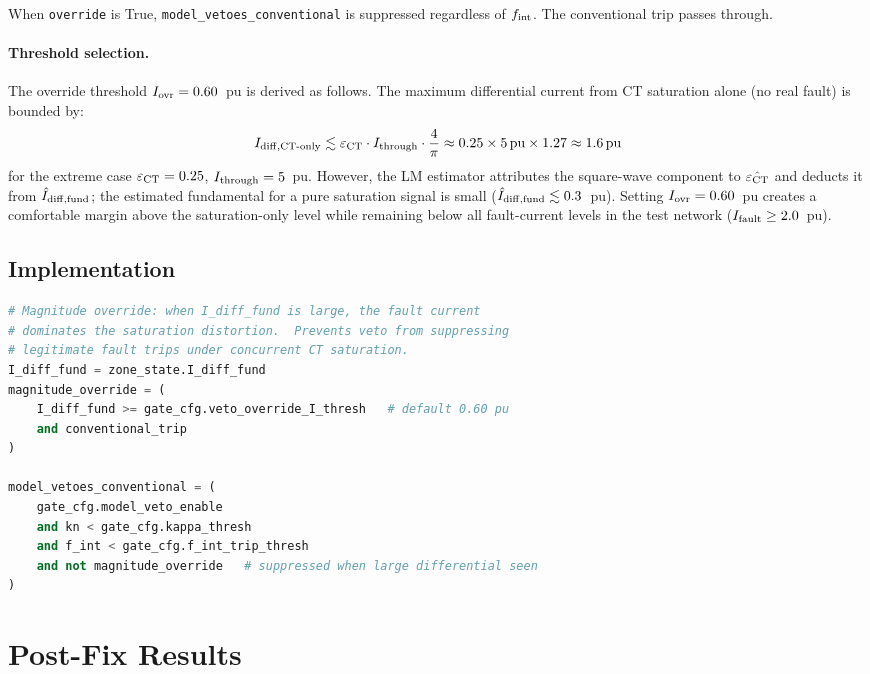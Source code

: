 \documentclass[12pt,a4paper]{article}
\newcommand{\fint}{f_{\rm int}}
\newcommand{\epsct}{\varepsilon_{\rm CT}}
\begin{document}
When \texttt{override} is True, \texttt{model\_vetoes\_conventional} is
suppressed regardless of $\fint$.  The conventional trip passes through.

\paragraph{Threshold selection.}
The override threshold $I_{\rm ovr} = 0.60$~pu is derived as follows.
The maximum differential current from CT saturation alone (no real fault)
is bounded by:
\begin{equation}
  I_{\rm diff,CT\text{-only}} \lesssim
    \epsct \cdot I_{\rm through} \cdot \frac{4}{\pi}
  \approx 0.25 \times 5\,\text{pu} \times 1.27 \approx 1.6\,\text{pu}
  \label{eq:bound}
\end{equation}
for the extreme case $\epsct = 0.25$, $I_{\rm through} = 5$~pu.  However,
the LM estimator attributes the square-wave component to $\hat{\epsct}$ and
deducts it from $\hat{I}_{\rm diff,fund}$; the estimated fundamental for a
pure saturation signal is small ($\hat{I}_{\rm diff,fund} \lesssim 0.3$~pu).
Setting $I_{\rm ovr} = 0.60$~pu creates a comfortable margin above the
saturation-only level while remaining below all fault-current levels in
the test network ($I_{\rm fault} \geq 2.0$~pu).

\subsection{Implementation}

\begin{lstlisting}[language=Python,
    caption={Magnitude override in \texttt{bus\_confidence\_gate.py}},
    label=lst:override]
# Magnitude override: when I_diff_fund is large, the fault current
# dominates the saturation distortion.  Prevents veto from suppressing
# legitimate fault trips under concurrent CT saturation.
I_diff_fund = zone_state.I_diff_fund
magnitude_override = (
    I_diff_fund >= gate_cfg.veto_override_I_thresh   # default 0.60 pu
    and conventional_trip
)

model_vetoes_conventional = (
    gate_cfg.model_veto_enable
    and kn < gate_cfg.kappa_thresh
    and f_int < gate_cfg.f_int_trip_thresh
    and not magnitude_override   # suppressed when large differential seen
)
\end{lstlisting}

\section{Post-Fix Results}
\end{document}
